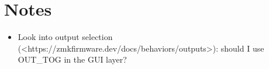 \documentclass[]{article}
\begin{document}
\section*{Notes}

\begin{itemize}
    \item Look into output selection (<https://zmkfirmware.dev/docs/behaviors/outputs>): should I use OUT\_TOG in the GUI layer?
\end{itemize}
\end{document}
